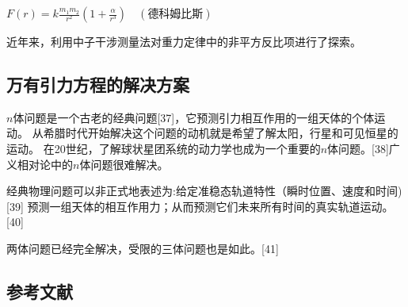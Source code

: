 $F(r) = k \frac{m_1 m_2}{r^2} \left(1 + \frac{\alpha}{r^3}\right) \quad (\text{德科姆比斯})$

近年来，利用中子干涉测量法对重力定律中的非平方反比项进行了探索。

\subsection{万有引力方程的解决方案}

$n$体问题是一个古老的经典问题[37]，它预测引力相互作用的一组天体的个体运动。 从希腊时代开始解决这个问题的动机就是希望了解太阳，行星和可见恒星的运动。 在20世纪，了解球状星团系统的动力学也成为一个重要的$n$体问题。[38]广义相对论中的$n$体问题很难解决。

经典物理问题可以非正式地表述为:给定准稳态轨道特性（瞬时位置、速度和时间)[39] 预测一组天体的相互作用力；从而预测它们未来所有时间的真实轨道运动。[40]

两体问题已经完全解决，受限的三体问题也是如此。[41]

\subsection{参考文献}

